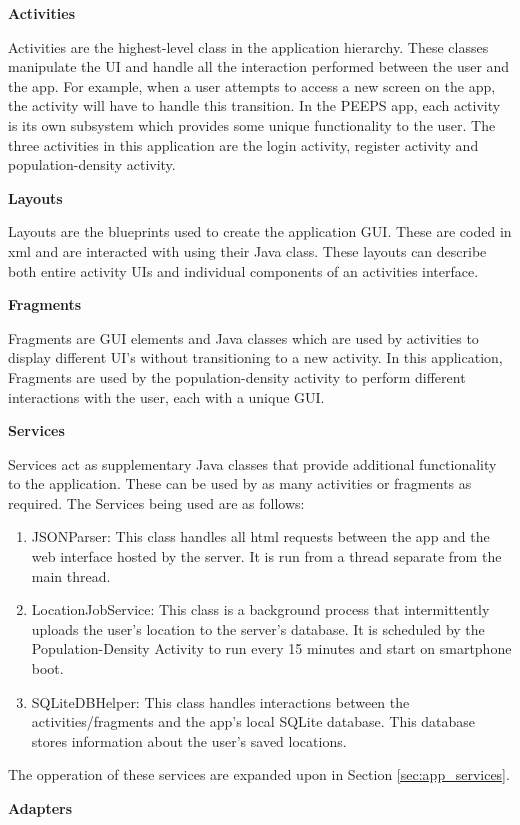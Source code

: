 \textbf{Activities}

Activities are the highest-level class in the application hierarchy. These classes manipulate the UI and handle all the interaction performed between the user and the app. For example, when a user attempts to access a new screen on the app, the activity will have to handle this transition. In the PEEPS app, each activity is its own subsystem which provides some unique functionality to the user. The three activities in this application are the login activity, register activity and population-density activity.

\textbf{Layouts}

Layouts are the blueprints used to create the application GUI. These are coded in xml and are interacted with using their Java class. These layouts can describe both entire activity UIs and individual components of an activities interface.

\textbf{Fragments}

Fragments are GUI elements and Java classes which are used by activities to display different UI’s without transitioning to a new activity. In this application, Fragments are used by the population-density activity to perform different interactions with the user, each with a unique GUI.

\textbf{Services}

Services act as supplementary Java classes that provide additional functionality to the application. These can be used by as many activities or fragments as required. The Services being used are as follows:
\begin{enumerate}
    \item JSONParser: This class handles all html requests between the app and the web interface hosted by the server. It is run from a thread separate from the main thread.
    \item LocationJobService: This class is a background process that intermittently uploads the user’s location to the server’s database. It is scheduled by the Population-Density Activity to run every 15 minutes and start on smartphone boot.
    \item SQLiteDBHelper: This class handles interactions between the activities/fragments and the app’s local SQLite database. This database stores information about the user’s saved locations.
\end{enumerate}
The opperation of these services are expanded upon in Section \ref{sec:app_services}.

\textbf{Adapters}

